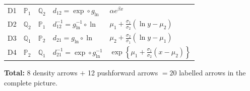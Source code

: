 \documentclass[11pt,a4paper]{article}
\begin{document}
\begin{center}
\begin{tabular}{lllll}
D1 & $\mathbb{P}_1$ & $\mathbb{Q}_2$ & $d_{12}=\exp\circ g_{\ln}$ & $\alpha e^{\beta x}$ \\
D2 & $\mathbb{Q}_2$ & $\mathbb{P}_1$ & $d_{12}^{-1}=g_{\ln}^{-1}\circ\ln$ & $\mu_1+\frac{\sigma_1}{\sigma_2}(\ln y-\mu_2)$ \\
D3 & $\mathbb{Q}_1$ & $\mathbb{P}_2$ & $d_{21}=g_{\ln}\circ\ln$ & $\mu_2+\frac{\sigma_2}{\sigma_1}(\ln y-\mu_1)$ \\
D4 & $\mathbb{P}_2$ & $\mathbb{Q}_1$ & $d_{21}^{-1}=\exp\circ g_{\ln}^{-1}$ & $\exp\!\left\{\mu_1+\frac{\sigma_1}{\sigma_2}(x-\mu_2)\right\}$ \\
\bottomrule
\end{tabular}
\end{center}

\noindent\textbf{Total:} 8 density arrows $+$ 12 pushforward arrows $= 20$ labelled arrows
in the complete picture.
\end{document}
